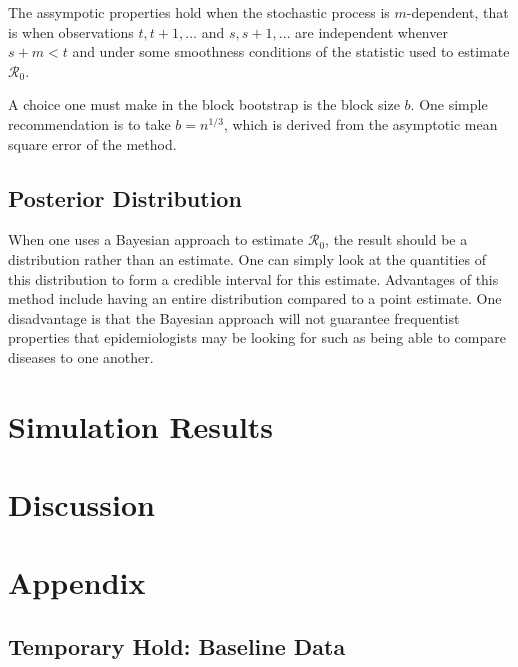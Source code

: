 \documentclass[12pt]{article}
\newcommand{\rr}{\ensuremath{\mathcal{R}_0}}
\begin{document}
The assympotic properties hold when the stochastic process is $m$-dependent, that is when observations $t, t+1, \dots$ and $s, s+1, \dots$ are independent whenver $s+m < t$ and under some smoothness conditions of the statistic used to estimate $\rr$.

A choice one must make in the block bootstrap is the block size $b$.  One simple recommendation is to take $b= n^{1/3}$, which is derived from the asymptotic mean square error of the method.


\subsection{Posterior Distribution}
When one uses a Bayesian approach to estimate $\rr$, the result should be a distribution rather than an estimate.  One can simply look at the quantities of this distribution to form a credible interval for this estimate.  Advantages of this method include having an entire distribution compared to a point estimate.  One disadvantage is that the Bayesian approach will not guarantee frequentist properties that epidemiologists may be looking for such as being able to compare diseases to one another.




\section{Simulation Results}\label{sec:sim-res}


\section{Discussion}\label{discussion}






\section{Appendix}

\subsection{Temporary Hold: Baseline Data}
\end{document}
